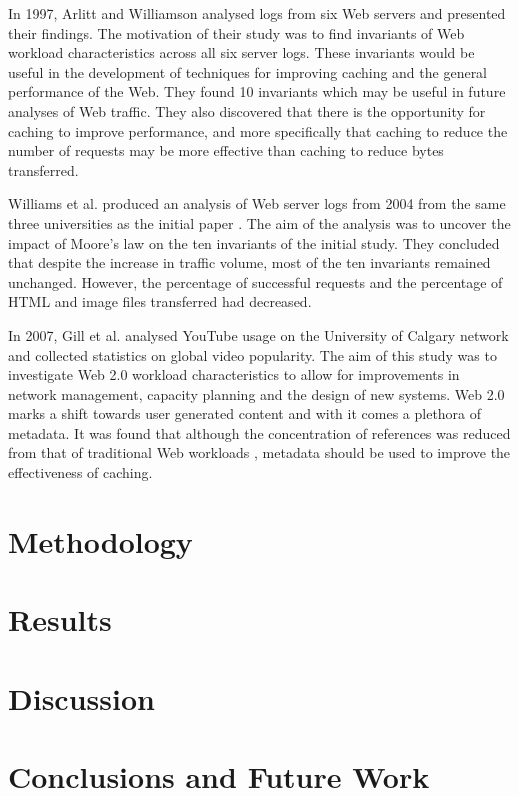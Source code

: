 \documentclass[10pt,conference]{IEEEtran}
\begin{document}
In 1997, Arlitt and Williamson \cite{keynote} analysed logs from six Web servers and presented their findings. The motivation of their study was to find invariants of Web workload characteristics across all six server logs. These invariants would be useful in the development of techniques for improving caching and the general performance of the Web. They found 10 invariants which may be useful in future analyses of Web traffic. They also discovered that there is the opportunity for caching to improve performance, and more specifically that caching to reduce the number of requests may be more effective than caching to reduce bytes transferred.

Williams et al. \cite{williams05} produced an analysis of Web server logs from 2004 from the same three universities as the initial paper \cite{keynote}. The aim of the analysis was to uncover the impact of Moore's law on the ten invariants of the initial study. They concluded that despite the increase in traffic volume, most of the ten invariants remained unchanged. However, the percentage of successful requests and the percentage of HTML and image files transferred had decreased. 

In 2007, Gill et al. \cite{youtube} analysed YouTube usage on the University of Calgary network and collected statistics on global video popularity. The aim of this study was to investigate Web 2.0 workload characteristics to allow for improvements in network management, capacity planning and the design of new systems. Web 2.0 marks a shift towards user generated content and with it comes a plethora of metadata. It was found that although the concentration of references was reduced from that of traditional Web workloads \cite{keynote}, metadata should be used to improve the effectiveness of caching.

\section{Methodology}

\section{Results}

\section{Discussion}

\section{Conclusions and Future Work}



\end{document}
